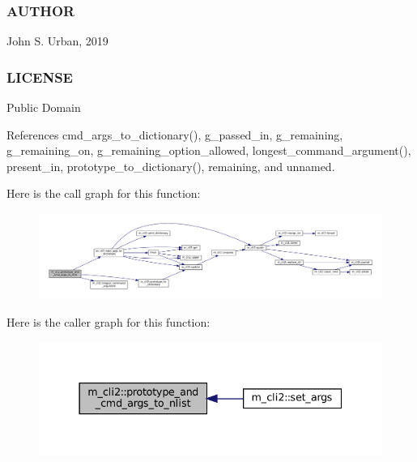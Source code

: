  \subsubsection*{A\+U\+T\+H\+OR}

John S. Urban, 2019 \subsubsection*{L\+I\+C\+E\+N\+SE}

Public Domain 

References cmd\+\_\+args\+\_\+to\+\_\+dictionary(), g\+\_\+passed\+\_\+in, g\+\_\+remaining, g\+\_\+remaining\+\_\+on, g\+\_\+remaining\+\_\+option\+\_\+allowed, longest\+\_\+command\+\_\+argument(), present\+\_\+in, prototype\+\_\+to\+\_\+dictionary(), remaining, and unnamed.

Here is the call graph for this function\+:\nopagebreak
\begin{figure}[H]
\begin{center}
\leavevmode
\includegraphics[width=350pt]{namespacem__cli2_a30083aabd53a9db9794ecbd23c2226d0_cgraph}
\end{center}
\end{figure}
Here is the caller graph for this function\+:\nopagebreak
\begin{figure}[H]
\begin{center}
\leavevmode
\includegraphics[width=337pt]{namespacem__cli2_a30083aabd53a9db9794ecbd23c2226d0_icgraph}
\end{center}
\end{figure}
\mbox{\label{namespacem__cli2_a14896d00e509cbc32f4df993a8d6f75b}} 
